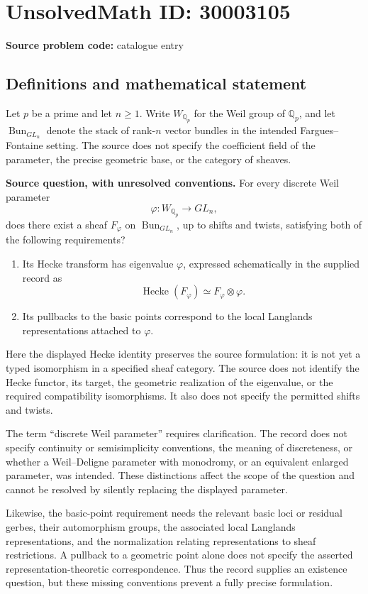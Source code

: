 \documentclass[11pt]{article}
\newcommand{\Q}{\mathbb{Q}}
\begin{document}
\section*{UnsolvedMath ID: 30003105}
\textbf{Source problem code:} catalogue entry
\subsection{Definitions and mathematical statement}
Let \(p\) be a prime and let \(n\geq 1\). Write \(W_{\Q_p}\) for the Weil group of \(\Q_p\), and let \(\operatorname{Bun}_{GL_n}\) denote the stack of rank-\(n\) vector bundles in the intended Fargues--Fontaine setting. The source does not specify the coefficient field of the parameter, the precise geometric base, or the category of sheaves.

\textbf{Source question, with unresolved conventions.} For every discrete Weil parameter
\[
\varphi:W_{\Q_p}\longrightarrow GL_n,
\]
does there exist a sheaf \(F_{\varphi}\) on \(\operatorname{Bun}_{GL_n}\), up to shifts and twists, satisfying both of the following requirements?
\begin{enumerate}
\item Its Hecke transform has eigenvalue \(\varphi\), expressed schematically in the supplied record as
\[
\operatorname{Hecke}(F_{\varphi})\simeq F_{\varphi}\otimes\varphi.
\]
\item Its pullbacks to the basic points correspond to the local Langlands representations attached to \(\varphi\).
\end{enumerate}
Here the displayed Hecke identity preserves the source formulation: it is not yet a typed isomorphism in a specified sheaf category. The source does not identify the Hecke functor, its target, the geometric realization of the eigenvalue, or the required compatibility isomorphisms. It also does not specify the permitted shifts and twists.

The term ``discrete Weil parameter'' requires clarification. The record does not specify continuity or semisimplicity conventions, the meaning of discreteness, or whether a Weil--Deligne parameter with monodromy, or an equivalent enlarged parameter, was intended. These distinctions affect the scope of the question and cannot be resolved by silently replacing the displayed parameter.

Likewise, the basic-point requirement needs the relevant basic loci or residual gerbes, their automorphism groups, the associated local Langlands representations, and the normalization relating representations to sheaf restrictions. A pullback to a geometric point alone does not specify the asserted representation-theoretic correspondence. Thus the record supplies an existence question, but these missing conventions prevent a fully precise formulation.
\end{document}
